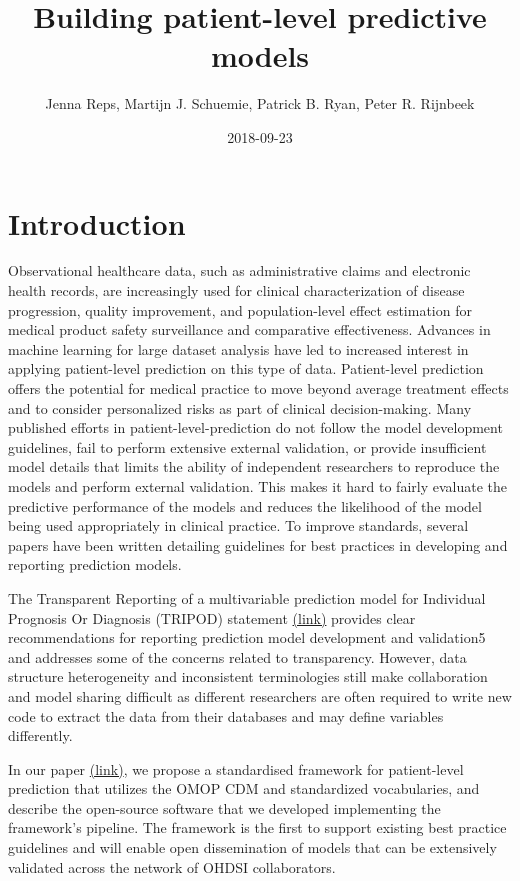 \documentclass[]{article}
\title{Building patient-level predictive models}
\author{Jenna Reps, Martijn J. Schuemie, Patrick B. Ryan, Peter R. Rijnbeek}
\date{2018-09-23}
\begin{document}
\maketitle

{
\setcounter{tocdepth}{2}
\tableofcontents
}
\section{Introduction}\label{introduction}

Observational healthcare data, such as administrative claims and
electronic health records, are increasingly used for clinical
characterization of disease progression, quality improvement, and
population-level effect estimation for medical product safety
surveillance and comparative effectiveness. Advances in machine learning
for large dataset analysis have led to increased interest in applying
patient-level prediction on this type of data. Patient-level prediction
offers the potential for medical practice to move beyond average
treatment effects and to consider personalized risks as part of clinical
decision-making. Many published efforts in patient-level-prediction do
not follow the model development guidelines, fail to perform extensive
external validation, or provide insufficient model details that limits
the ability of independent researchers to reproduce the models and
perform external validation. This makes it hard to fairly evaluate the
predictive performance of the models and reduces the likelihood of the
model being used appropriately in clinical practice. To improve
standards, several papers have been written detailing guidelines for
best practices in developing and reporting prediction models.

The Transparent Reporting of a multivariable prediction model for
Individual Prognosis Or Diagnosis (TRIPOD) statement
\href{https://www.equator-network.org/reporting-guidelines/tripod-statement/}{(link)}
provides clear recommendations for reporting prediction model
development and validation5 and addresses some of the concerns related
to transparency. However, data structure heterogeneity and inconsistent
terminologies still make collaboration and model sharing difficult as
different researchers are often required to write new code to extract
the data from their databases and may define variables differently.

In our paper
\href{https://academic.oup.com/jamia/article/25/8/969/4989437}{(link)},
we propose a standardised framework for patient-level prediction that
utilizes the OMOP CDM and standardized vocabularies, and describe the
open-source software that we developed implementing the framework's
pipeline. The framework is the first to support existing best practice
guidelines and will enable open dissemination of models that can be
extensively validated across the network of OHDSI collaborators.
\end{document}

